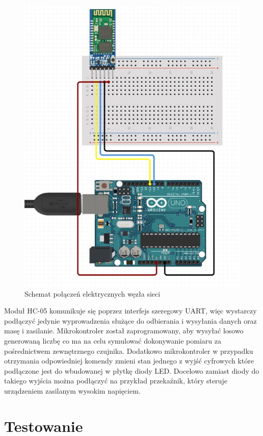 \documentclass[12pt, twoside, openany]{mwrep}
\begin{document}
\begin{figure}[H]
\centering
\includegraphics[scale=0.7]{schemat}
\caption{Schemat połączeń elektrycznych węzła sieci}
\end{figure}
\par
Moduł HC-05 komunikuje się poprzez interfejs szeregowy UART, więc wystarczy podłączyć jedynie wyprowadzenia służące do odbierania i wysyłania danych oraz masę i zasilanie. Mikrokontroler został zaprogramowany, aby wysyłać losowo generowaną liczbę co ma na celu symulować dokonywanie pomiaru za pośrednictwem zewnętrznego czujnika. Dodatkowo mikrokontroler w przypadku otrzymania odpowiedniej komendy zmieni stan jednego z wyjść cyfrowych które podłączone jest do wbudowanej w płytkę diody LED. Docelowo zamiast diody do takiego wyjścia można podłączyć na przykład przekaźnik, który steruje urządzeniem zasilanym wysokim napięciem.

\chapter{Testowanie}
\end{document}
